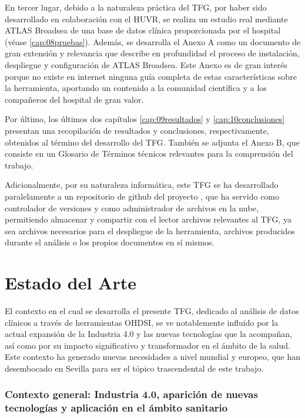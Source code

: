 En tercer lugar, debido a la naturaleza práctica del TFG, por haber sido desarrollado en colaboración con el HUVR, se realiza un estudio real mediante ATLAS Broadsea de una base de datos clínica proporcionada por el hospital (véase \ref{cap:08pruebas}). Además, se desarrolla el Anexo A como un documento de gran extensión y relevancia que describe en profundidad el proceso de instalación, despliegue y configuración de ATLAS Broadsea. Este Anexo es de gran interés porque no existe en internet ninguna guía completa de estas características sobre la herramienta, aportando un contenido a la comunidad científica y a los compañeros del hospital de gran valor.

Por último, los últimos dos capítulos \ref{cap:09resultados} y \ref{cap:10conclusiones} presentan una recopilación de resultados y conclusiones, respectivamente, obtenidos al término del desarrollo del TFG. También se adjunta el Anexo B, que consiste en un Glosario de Términos técnicos relevantes para la comprensión del trabajo. 

Adicionalmente, por su naturaleza informática, este TFG se ha desarrollado paralelamente a un repositorio de github del proyecto \cite{vallealonsodc}, que ha servido como controlador de versiones y como administrador de archivos en la nube, permitiendo almacenar y compartir con el lector archivos relevantes al TFG, ya sea archivos necesarios para el despliegue de la herramienta, archivos producidos durante el análisis o los propios documentos en sí mismos.

\section{Estado del Arte} \label{sec:01EstadoArte} 
 
El contexto en el cual se desarrolla el presente TFG, dedicado al análisis de datos clínicos a través de herramientas OHDSI, se ve notablemente influido por la actual expansión de la Industria 4.0 y las nuevas tecnologías que la acompañan, así como por su impacto significativo y transformador en el ámbito de la salud. Este contexto ha generado nuevas necesidades a nivel mundial y europeo, que han desembocado en Sevilla para ser el tópico trascendental de este trabajo.


\subsubsection{Contexto general: Industria 4.0, aparición de nuevas tecnologías y aplicación en el ámbito sanitario}

